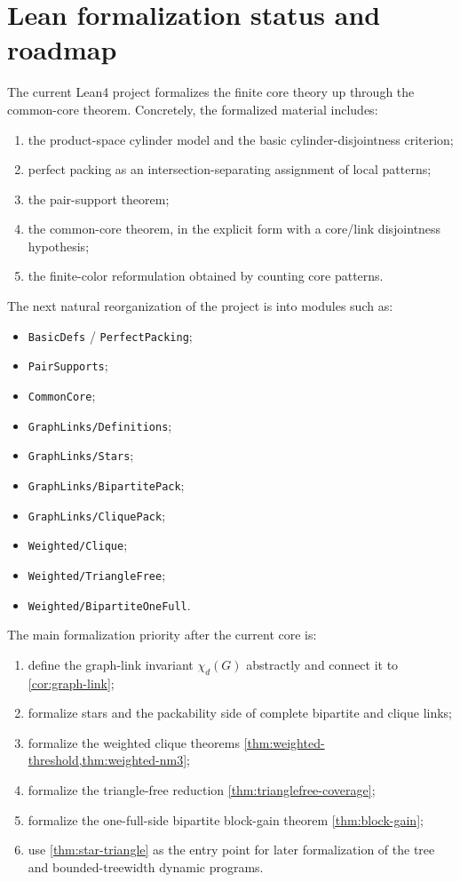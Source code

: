 \documentclass[11pt]{article}
\theoremstyle{definition}
\newcommand{\Chi}{\chi}
\begin{document}
\section{Lean formalization status and roadmap}
The current Lean4 project formalizes the finite core theory up through the common-core theorem. Concretely, the formalized material includes:
\begin{enumerate}[label=(\arabic*)]
    \item the product-space cylinder model and the basic cylinder-disjointness criterion;
    \item perfect packing as an intersection-separating assignment of local patterns;
    \item the pair-support theorem;
    \item the common-core theorem, in the explicit form with a core/link disjointness hypothesis;
    \item the finite-color reformulation obtained by counting core patterns.
\end{enumerate}

The next natural reorganization of the project is into modules such as:
\begin{itemize}
    \item \texttt{BasicDefs} / \texttt{PerfectPacking};
    \item \texttt{PairSupports};
    \item \texttt{CommonCore};
    \item \texttt{GraphLinks/Definitions};
    \item \texttt{GraphLinks/Stars};
    \item \texttt{GraphLinks/BipartitePack};
    \item \texttt{GraphLinks/CliquePack};
    \item \texttt{Weighted/Clique};
    \item \texttt{Weighted/TriangleFree};
    \item \texttt{Weighted/BipartiteOneFull}.
\end{itemize}

The main formalization priority after the current core is:
\begin{enumerate}[label=(\arabic*)]
    \item define the graph-link invariant \(\Chi_d(G)\) abstractly and connect it to \cref{cor:graph-link};
    \item formalize stars and the packability side of complete bipartite and clique links;
    \item formalize the weighted clique theorems \cref{thm:weighted-threshold,thm:weighted-nm3};
    \item formalize the triangle-free reduction \cref{thm:trianglefree-coverage};
    \item formalize the one-full-side bipartite block-gain theorem \cref{thm:block-gain};
    \item use \cref{thm:star-triangle} as the entry point for later formalization of the tree and bounded-treewidth dynamic programs.
\end{enumerate}
\end{document}
